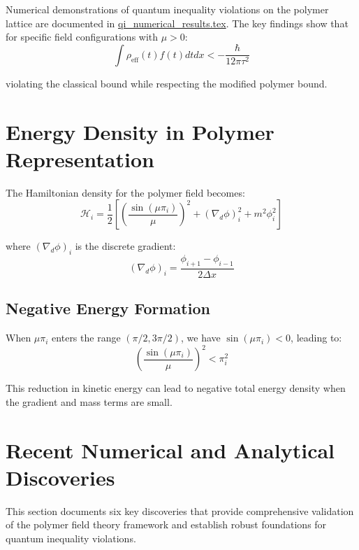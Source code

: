\documentclass[12pt]{article}
\begin{document}
Numerical demonstrations of quantum inequality violations on the polymer lattice are documented in \href{file:qi_numerical_results.tex}{qi\_numerical\_results.tex}. The key findings show that for specific field configurations with $\mu > 0$:
\begin{equation}
\int \rho_{\text{eff}}(t) f(t) dt dx < -\frac{\hbar}{12\pi\tau^2}
\end{equation}

violating the classical bound while respecting the modified polymer bound.

\section{Energy Density in Polymer Representation}

The Hamiltonian density for the polymer field becomes:
\begin{equation}
\mathcal{H}_i = \frac{1}{2}\left[ \left(\frac{\sin(\mu \pi_i)}{\mu}\right)^2 + (\nabla_d \phi)_i^2 + m^2 \phi_i^2 \right]
\end{equation}

where $(\nabla_d \phi)_i$ is the discrete gradient:
\begin{equation}
(\nabla_d \phi)_i = \frac{\phi_{i+1} - \phi_{i-1}}{2\Delta x}
\end{equation}

\subsection{Negative Energy Formation}

When $\mu \pi_i$ enters the range $(\pi/2, 3\pi/2)$, we have $\sin(\mu \pi_i) < 0$, leading to:
\begin{equation}
\left(\frac{\sin(\mu \pi_i)}{\mu}\right)^2 < \pi_i^2
\end{equation}

This reduction in kinetic energy can lead to negative total energy density when the gradient and mass terms are small.

\section{Recent Numerical and Analytical Discoveries}

This section documents six key discoveries that provide comprehensive validation of the polymer field theory framework and establish robust foundations for quantum inequality violations.
\end{document}
